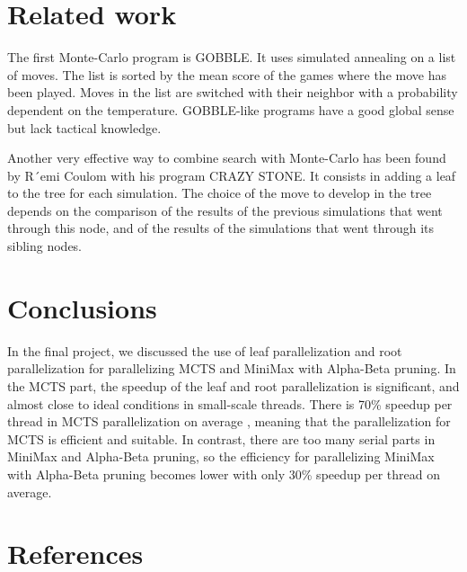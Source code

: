 \documentclass[sigconf]{acmart}
\begin{document}
\section{Related work}
The first Monte-Carlo program is GOBBLE. It uses simulated annealing on a list of moves. The list is sorted by the mean score of the games where the move has been played. Moves in the list are switched with their neighbor with a probability dependent on the temperature. GOBBLE-like programs have a good global sense but lack tactical knowledge.

Another very effective way to combine search with Monte-Carlo has been found by R´emi Coulom with his program CRAZY STONE. It consists in adding a leaf to the tree for each simulation. The choice of the move to develop in the tree depends on the comparison of the results of the previous simulations that went through this node, and of the results of the simulations that went through its sibling nodes.







\section{Conclusions}
In the final project, we discussed the use of leaf parallelization and root parallelization for parallelizing MCTS and MiniMax with Alpha-Beta pruning. In the MCTS part, the speedup of the leaf and root parallelization is significant, and almost close to ideal conditions in small-scale threads. There is 70\% speedup per thread in MCTS parallelization on average , meaning that the parallelization for MCTS is efficient and suitable. In contrast, there are too many serial parts in MiniMax and Alpha-Beta pruning, so the efficiency for parallelizing MiniMax with Alpha-Beta pruning becomes lower with only 30\% speedup per thread on average.






\section{References}
\end{document}

